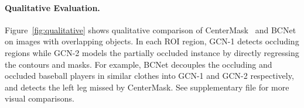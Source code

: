 \begin{comment}
\begin{figure}[!h]
\centering
\texttt{[image: figures/amodal\_example.pdf]}
\caption{Visualization comparison of the amodal mask prediction by Mask R-CNN + ASN~\cite{qi2019amodal} and ours, both using ResNet-101-FPN, where the occluded region of the front car is estimated more completely by BCNet. }
\label{fig:amodal_example}
\vspace{-0.3in}
\end{figure}
\end{comment}

\begin{comment}
\begin{table}[!h]
	\caption{Performance comparison on COCO-OCC split.}
	\centering
	\label{amodal_tab:1}
	\resizebox{0.6\linewidth}{!}{
		\begin{tabular}{l | c | c }
			\toprule
			Model &  &  \\
			\midrule
			Mask R-CNN~\cite{he2016deep} & 29.67 & 49.95 \\
			MS R-CNN~\cite{huang2019mask} & 30.32 & 50.01 \\
			CenterMask~\cite{lee2019centermask} & 29.05 & 49.07 \\
			\midrule
			\textbf{Ours} & 31.71 & 51.15\\
			\textbf{Ours + Synthetic} & \textbf{32.89} & \textbf{53.25}\\
			\bottomrule
		\end{tabular}
	}
\end{table} 
\end{comment}

\paragraph{Qualitative Evaluation.}
Figure~\ref{fig:qualitative} shows 
qualitative comparison of CenterMask~\cite{lee2019centermask} and BCNet on images with overlapping objects. In each ROI region, GCN-1 detects occluding regions while GCN-2 models the partially occluded instance by directly regressing the contours and masks. For example, BCNet decouples the occluding and occluded baseball players in similar clothes into GCN-1 and GCN-2 respectively, and detects the left leg missed by CenterMask. See supplementary file for more visual comparisons.
\vspace{-0.05in}

